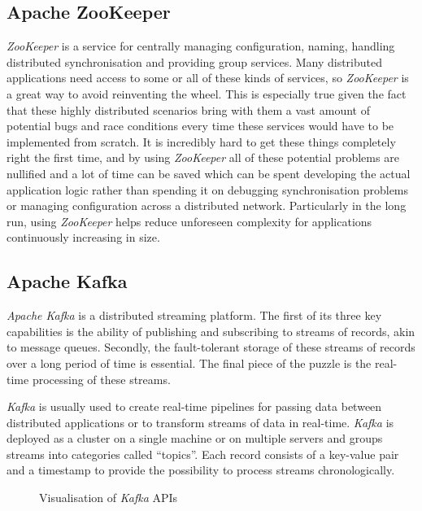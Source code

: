 \subsection{Apache ZooKeeper}

\textit{ZooKeeper} is a service for centrally managing configuration, naming, handling distributed
synchronisation and providing group services. Many distributed applications need access to some or
all of these kinds of services, so \textit{ZooKeeper} is a great way to avoid reinventing the wheel.
This is especially true given the fact that these highly distributed scenarios bring with them a
vast amount of potential bugs and race conditions every time these services would have to be
implemented from scratch. It is incredibly hard to get these things completely right the first time,
and by using \textit{ZooKeeper} all of these potential problems are nullified and a lot of time can
be saved which can be spent developing the actual application logic rather than spending it on
debugging synchronisation problems or managing configuration across a distributed network.
Particularly in the long run, using \textit{ZooKeeper} helps reduce unforeseen complexity for
applications continuously increasing in size.
\cite{zookeeper-homepage}

\subsection{Apache Kafka}

\textit{Apache Kafka} is a distributed streaming platform. The first of its three key capabilities
is the ability of publishing and subscribing to streams of records, akin to message queues.
Secondly, the fault-tolerant storage of these streams of records over a long period of time is
essential. The final piece of the puzzle is the real-time processing of these streams.

\textit{Kafka} is usually used to create real-time pipelines for passing data between distributed
applications or to transform streams of data in real-time. \textit{Kafka} is deployed as a cluster
on a single machine or on multiple servers and groups streams into categories called “topics”. Each
record consists of a key-value pair and a timestamp to provide the possibility to process streams
chronologically.

\begin{figure}[H]
  \centering
  \caption{Visualisation of \textit{Kafka} APIs \cite{kafka-complete-introduction}}
\end{figure}

